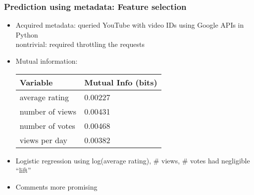 \documentclass[fleqn]{beamer}
\begin{document}
\begin{frame}
\frametitle{Prediction using metadata: Feature selection}
      \begin{itemize}
      	\item Acquired metadata: queried YouTube with video IDs using Google APIs in Python\\
	         nontrivial: required throttling the requests
          \item Mutual information: \\
          		\begin{center}
        			\begin{tabular}{ | l | l |}
			\hline
			Variable & Mutual Info (bits) \\ \hline
			average rating & 0.00227\\ \hline
			number of views & 0.00431\\ \hline
			number of votes & 0.00468\\ \hline
			views per day & 0.00382 \\
			\hline
			\end{tabular}

      		\end{center}	
          \item Logistic regression using log(average rating), \# views, \# votes
                   had negligible ``lift''
          \item Comments more promising
      \end{itemize}

\end{frame}
\end{document}
